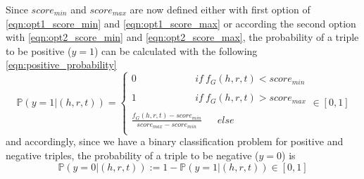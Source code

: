 Since $score_{min}$ and $score_{max}$ are now defined either with first option of 
\autoref{eqn:opt1_score_min} and \ref{eqn:opt1_score_max} or according the second option with 
\autoref{eqn:opt2_score_min} and \ref{eqn:opt2_score_max}, the probability of a triple to be positive ($y = 1$) can be calculated with the following \autoref{eqn:positive_probability}
\begin{equation}  \label{eqn:positive_probability}
    \mathds{P}(y = 1|(h, r, t)) =
    \begin{cases}
        0 \ \ \ \ \ \ \ \ \ \ \ \ \ \ \ \ \ \ \ \ \ \ \ \ \ \ \  
        if \  f_G(h,r,t) < score_{min}
         
        \\ \\
        1 \ \ \ \ \ \ \ \ \ \ \ \ \ \ \ \ \ \ \ \ \ \ \ \ \ \ \ 
        if \ f_G(h,r,t) > score_{max}
         
        \\ \\
        \frac{f_G(h,r,t) - score_{min}}{score_{max} - score_{min}}
        \ \ \ \ \ \ \ 
        else
        \\
    \end{cases}  \in [0, 1]
\end{equation}
and accordingly, since we have a binary classification problem for positive and negative triples, the probability of a triple to be negative ($y=0$) is
\begin{equation} \label{eqn:negative_probability}
    \mathds{P}(y = 0|(h, r, t)) := 1 - \mathds{P}(y = 1|(h, r, t)) \in [0,1]
\end{equation}